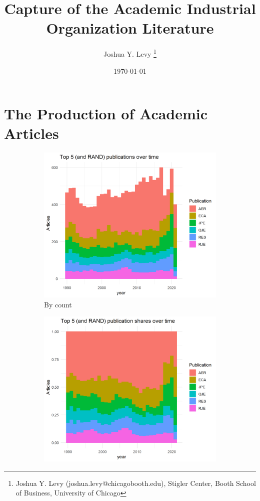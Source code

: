 \documentclass[11pt, letterpaper, twoside]{article}
\title{\singlespacing\textbf{Capture of the Academic Industrial Organization Literature}}
\author{ 
    Joshua Y. Levy \thanks{Joshua Y. Levy  (joshua.levy@chicagobooth.edu), Stigler Center, Booth School of Business, University of Chicago}}
\date{\today}
\begin{document}
\begin{titlepage}
    \maketitle
    \thispagestyle{empty}
\end{titlepage}


\newpage
{}


\section{The Production of Academic Articles}


\begin{figure}
    \begin{subfigure}[!htbp]{0.49\textwidth}
        \centering
        \includegraphics[width=\textwidth]{top_5_over_time_col.png}
        \caption{By count}
    \end{subfigure}
    \hfill
    \begin{subfigure}[!htbp]{0.49\textwidth}
        \centering
        \includegraphics[width=\textwidth]{top_5_over_time_col_shares.png}

\end{subfigure}
\end{figure}
\end{document}
